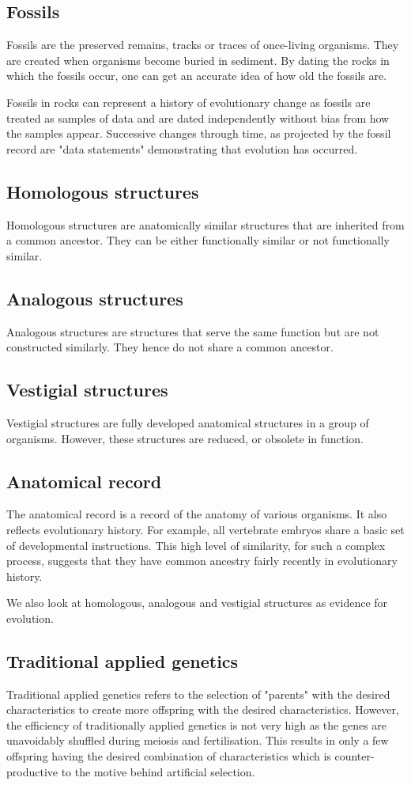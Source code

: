 \documentclass[11pt]{article}
\begin{document}
\subsection{Fossils}
\label{sec:org1bba038}
Fossils are the preserved remains, tracks or traces of once-living organisms. They are created when organisms become buried in sediment. By dating the rocks in which the fossils occur, one can get an accurate idea of how old the fossils are.


Fossils in rocks can represent a history of evolutionary change as fossils are treated as samples of data and are dated independently without bias from how the samples appear. Successive changes through time, as projected by the fossil record are "data statements" demonstrating that evolution has occurred.
\subsection{Homologous structures}
\label{sec:orgd2ca17c}
Homologous structures are anatomically similar structures that are inherited from a common ancestor. They can be either functionally similar or not functionally similar.
\subsection{Analogous structures}
\label{sec:org932d2aa}
Analogous structures are structures that serve the same function but are not constructed similarly. They hence do not share a common ancestor.
\subsection{Vestigial structures}
\label{sec:orgf445be5}
Vestigial structures are fully developed anatomical structures in a group of organisms. However, these structures are reduced, or obsolete in function.
\subsection{Anatomical record}
\label{sec:org26cc2da}
The anatomical record is a record of the anatomy of various organisms. It also reflects evolutionary history. For example, all vertebrate embryos share a basic set of developmental instructions. This high level of similarity, for such a complex process, suggests that they have common ancestry fairly recently in evolutionary history.


We also look at homologous, analogous and vestigial structures as evidence for evolution.
\subsection{Traditional applied genetics}
\label{sec:org57c4682}
Traditional applied genetics refers to the selection of "parents" with the desired characteristics to create more offspring with the desired characteristics. However, the efficiency of traditionally applied genetics is not very high as the genes are unavoidably shuffled during meiosis and fertilisation. This results in only a few offspring having the desired combination of characteristics which is counter-productive to the motive behind artificial selection.
\end{document}
